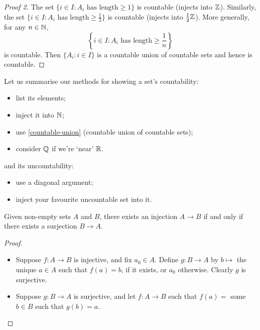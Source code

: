 \documentclass{../../template/note}
\begin{document}
    \begin{proof}[Proof 2]
        The set \(\{i \in I: A_i \text{ has length} \geq 1\}\) is countable (injects into \(\mathbb Z\)). Similarly, the set \(\{i \in I: A_i \text{ has length} \geq \frac 1 2\}\) is countable (injects into \(\frac{1}{2}\mathbb Z\)). More generally, for any \(n \in \mathbb N\),
        \[
            \left\{i \in I: A_i \text{ has length} \geq \frac 1 n\right\}
        \]
        is countable. Then \(\{A_i: i \in I\}\) is a countable union of countable sets and hence is countable.
    \end{proof}
    

    Let us summarise our methods for showing a set's countability:
    \begin{itemize}
        \item list its elements;
        \item inject it into \(\mathbb N\);
        \item use \cref{countable-union} (countable union of countable sets);
        \item consider \(\mathbb Q\) if we're `near' \(\mathbb R\).
    \end{itemize}
    and its uncountability:
    \begin{itemize}
        \item use a diagonal argument;
        \item inject your favourite uncountable set into it.
    \end{itemize}
    
    \begin{lemma}
        Given non-empty sets \(A\) and \(B\), there exists an injection \(A \to B\) if and only if there exists a surjection \(B \to A\).
    \end{lemma}
    
    \begin{proof}
        \begin{itemize}
            \item[\(\implies\)] Suppose \(f: A \to B\) is injective, and fix \(a_0 \in A\). Define \(g: B \to A\) by \(b \mapsto\) the unique \(a \in A\) such that \(f(a) = b\), if it exists, or \(a_0\) otherwise. Clearly \(g\) is surjective.
            \item[\(\impliedby\)] Suppose \(g: B \to A\) is surjective, and let \(f: A \to B\) such that \(f(a) =\) some \(b \in B\) such that \(g(b) = a\).
        \end{itemize}
    \end{proof}
    
\end{document}
